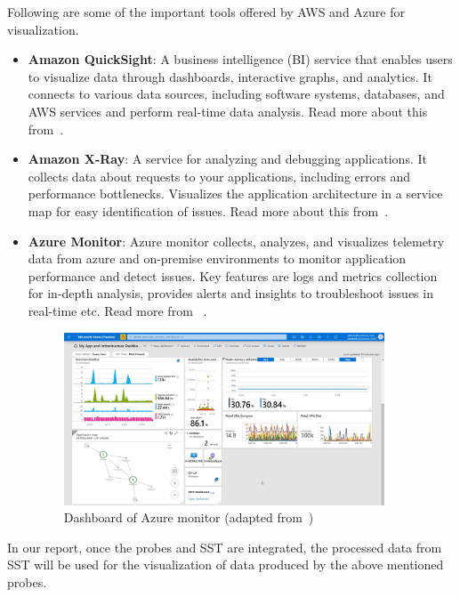 Following are some of the important tools offered by AWS and Azure for visualization.
\begin{itemize}[label=$\bullet$]
	\item \textbf{Amazon QuickSight}: A business intelligence (BI) service that enables users to visualize data through dashboards, interactive graphs, and analytics. It connects to various data sources, including software systems, databases, and AWS services and perform real-time data analysis. Read more about this from~\citep{AWSQuickSight2025}. 
	\item \textbf{Amazon X-Ray}: A service for analyzing and debugging applications. It collects data about requests to your applications, including errors and performance bottlenecks. Visualizes the application architecture in a service map for easy identification of issues. Read more about this from~\citep{AWSXRay2025}.
	\item \textbf{Azure Monitor}: Azure monitor collects, analyzes, and visualizes telemetry data from azure and on-premise environments to monitor application performance and detect issues. Key features are logs and metrics collection for in-depth analysis, provides alerts and insights to troubleshoot issues in real-time etc. Read more from ~\citep{AzureMonitor2025}.
	
	\begin{figure}[H]
		\centering
		\includegraphics[width=0.9\textwidth]{figures/azure_monitor_dashboard.png}
		\caption[Azure Monitor]{Dashboard of Azure monitor (adapted from~\cite{AzureMonitorBestPractices2025})}
		\label{fig_azure_monitor}
	\end{figure}

\end{itemize}


In our report, once the probes and SST are integrated, the processed data from SST will be used for the visualization of data produced by the above mentioned probes. 

